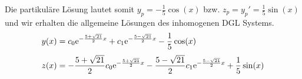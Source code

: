 \documentclass[main.tex]{subfiles}
\begin{document}
Die partikuläre Lösung lautet somit $y_p = -\frac{1}{5} \cos(x)$ bzw. $z_p = y_p' = \frac{1}{5} \sin(x)$ und wir erhalten 
die allgemeine Lösungen des inhomogenen DGL Systems.
\begin{align*}
    y(x) &= c_0 \mathrm{e}^{-\frac{5+\sqrt{21}}{2} x} + c_1 \mathrm{e}^{-\frac{5-\sqrt{21}}{2} x} -\frac{1}{5} \cos(x) \\[1mm]
    z(x) &= -\frac{5+\sqrt{21}}{2} c_0 \mathrm{e}^{-\frac{5+\sqrt{21}}{2} x} -\frac{5-\sqrt{21}}{2} c_1 \mathrm{e}^{-\frac{5-\sqrt{21}}{2} x} + \frac{1}{5} \sin(x)
\end{align*}
\end{document}
